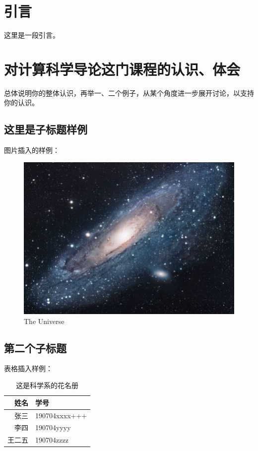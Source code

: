 \documentclass{article}
\begin{document}
\thispagestyle{empty}
\newpage
\setcounter{page}{1}
\section{引言}
这里是一段引言。

\section{对计算科学导论这门课程的认识、体会}
总体说明你的整体认识，再举一、二个例子，从某个角度进一步展开讨论，以支持你的认识。\par

\subsection{这里是子标题样例}
图片插入的样例：\par
\begin{figure}[h!]
\centering
\includegraphics[scale=1.7]{universe}
\caption{The Universe}
\label{fig:universe}
\end{figure}

\subsection{第二个子标题}
表格插入样例：\par

\begin{table}[h]
    \centering
    \caption{这是科学系的花名册}
\begin{tabular}{rl}
    \hline
    姓名 & 学号 \\
    \hline
    张三 & 190704xxxx+++ \\ 
    李四 & 190704yyyy \\
    王二五 & 190704zzzz\\
    \hline
\end{tabular}
    \label{table1}
\end{table}
\end{document}
